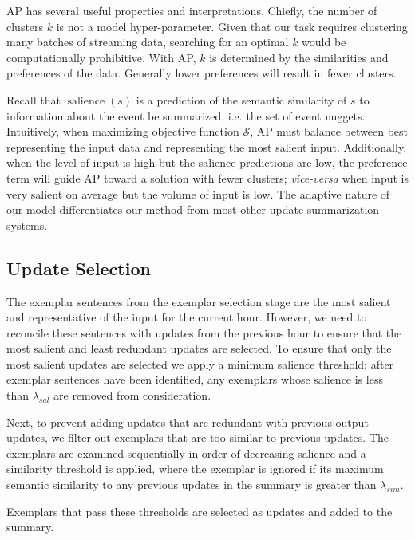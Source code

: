 AP has several useful properties and interpretations. Chiefly, the number
of clusters $k$ is not a model hyper-parameter. Given that our task requires
clustering many batches of streaming data, searching for an optimal $k$ 
would be computationally prohibitive. With AP, $k$ is determined by the
similarities and preferences of the data. Generally lower preferences will
result in fewer clusters.  


Recall that $\operatorname{salience}(s)$ is a prediction of the semantic 
similarity of $s$ to information about the event be summarized, i.e. the set 
of event nuggets. Intuitively, when maximizing objective function 
$\mathcal{S}$, AP must balance between best representing the input data and 
representing the most salient input. Additionally, when the level of input is 
high but the salience predictions are low, the preference term will guide AP 
toward a solution with fewer clusters; \textit{vice-versa} when input is very 
salient on average but the volume of input is low. The adaptive nature of our 
model differentiates our method from most other update summarization systems.


\subsection{Update Selection}
\label{sec:upsel}


The exemplar sentences from the exemplar selection stage are the most salient 
and representative of the input for the current hour. However, we need to 
reconcile these sentences with updates from the previous hour to ensure that 
the most salient and least redundant  updates are selected. To ensure that 
only the most salient updates are selected we apply a minimum salience 
threshold; after exemplar sentences have been identified, any exemplars whose 
salience is less than $\lambda_{sal}$ are removed from consideration. 


Next, to prevent adding updates that are redundant with previous output 
updates, we filter out exemplars that are too similar to previous updates.
The exemplars are examined sequentially in order of decreasing salience and  a similarity threshold is applied, where the exemplar is ignored if its maximum 
semantic similarity to any previous updates in the summary is greater than 
$\lambda_{sim}$.


Exemplars that pass these thresholds are selected as updates and added
to the summary.
